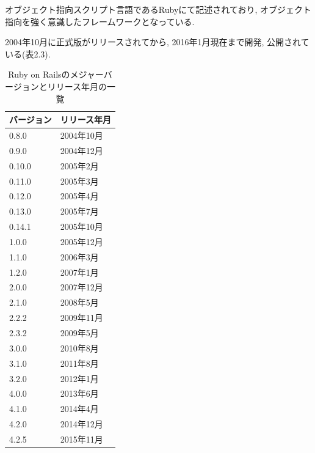 オブジェクト指向スクリプト言語であるRubyにて記述されており, オブジェクト指向を強く意識したフレームワークとなっている.

2004年10月に正式版がリリースされてから, 2016年1月現在まで開発, 公開されている(表2.3).

\begin{table}[tb]
\begin{center}
\begin{tabular}{|l|l|} \hline
バージョン & リリース年月 \\ \hline \hline
0.8.0 & 2004年10月 \\ \hline
0.9.0 & 2004年12月 \\ \hline
0.10.0 & 2005年2月 \\ \hline
0.11.0 & 2005年3月 \\ \hline
0.12.0 & 2005年4月 \\ \hline
0.13.0 & 2005年7月 \\ \hline
0.14.1 & 2005年10月 \\ \hline
1.0.0 & 2005年12月 \\ \hline
1.1.0 & 2006年3月 \\ \hline
1.2.0 & 2007年1月 \\ \hline
2.0.0 & 2007年12月 \\ \hline
2.1.0 & 2008年5月 \\ \hline
2.2.2 & 2009年11月 \\ \hline
2.3.2 & 2009年5月 \\ \hline
3.0.0 & 2010年8月 \\ \hline
3.1.0 & 2011年8月 \\ \hline
3.2.0 & 2012年1月 \\ \hline
4.0.0 & 2013年6月 \\ \hline
4.1.0 & 2014年4月 \\ \hline
4.2.0 & 2014年12月 \\ \hline
4.2.5 & 2015年11月 \\ \hline
\end{tabular}
\caption{Ruby on Railsのメジャーバージョンとリリース年月の一覧}
\end{center}
\end{table}

